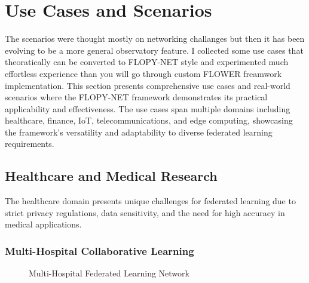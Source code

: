 \section{Use Cases and Scenarios}
\label{sec:use-cases-scenarios}
The scenarios were thought mostly on networking challanges but then it has been evolving to be a more general observatory feature. I collected some use cases that theoratically can be converted to FLOPY-NET style and experimented much effortless experience than you will go through custom FLOWER freamwork implementation.
\newline
This section presents comprehensive use cases and real-world scenarios where the FLOPY-NET framework demonstrates its practical applicability and effectiveness. The use cases span multiple domains including healthcare, finance, IoT, telecommunications, and edge computing, showcasing the framework's versatility and adaptability to diverse federated learning requirements.

\subsection{Healthcare and Medical Research}

The healthcare domain presents unique challenges for federated learning due to strict privacy regulations, data sensitivity, and the need for high accuracy in medical applications.

\subsubsection{Multi-Hospital Collaborative Learning}

\begin{figure}[htbp]
\centering
{}
\caption{Multi-Hospital Federated Learning Network}
\label{fig:hospital-network}
\end{figure}

